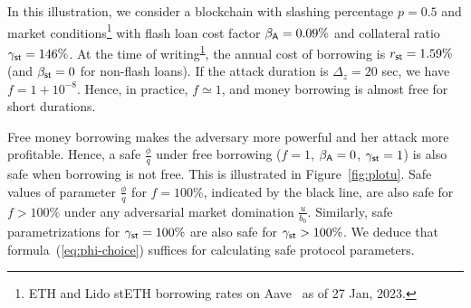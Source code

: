 In this illustration,
we consider a blockchain with slashing percentage
$p = 0.5$ and market conditions\footnote{\label{footnote:aave}ETH and Lido stETH borrowing rates
on Aave~\cite{aave} as of 27 Jan, 2023.}
with \asset flash loan cost factor $\beta_{\textsf{A}} = 0.09\%$ and
collateral ratio $\gamma_{\textsf{st}} = 146\%$.
At the time of writing\textsuperscript{\ref{footnote:aave}}, the annual cost of borrowing \stasset
is $r_{\textsf{st}} = 1.59\%$ (and $\beta_{\textsf{st}} = 0$ for non-flash loans).
If the attack duration is $\Delta_z = 20$ sec, we have
 $f = 1 + 10^{-8}$.
Hence, in practice, $f \simeq 1$, and money borrowing is almost free
for short durations.

Free money borrowing makes the adversary more powerful
and her attack more profitable.
Hence, a safe $\frac{\phi}{q}$ under free
borrowing ($f = 1$, $\beta_{\textsf{A}} = 0$, $\gamma_{\textsf{st}} = 1$)
is also safe when borrowing is not free.
This is illustrated in
Figure~\ref{fig:plotu}. Safe values of parameter $\frac{\phi}{q}$
for $f = 100\%$, indicated by the black line, are also safe for $f > 100\%$
under any adversarial market domination $\frac{u}{b_0}$.
Similarly, safe parametrizations for $\gamma_{\textsf{st}} = 100\%$ are also safe
for $\gamma_{\textsf{st}} > 100\%$.
We deduce that formula~(\ref{eq:phi-choice}) suffices for calculating
safe protocol parameters.

